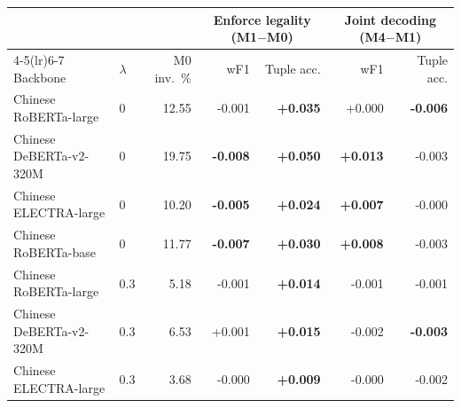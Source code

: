 \begin{tabular}{llrrrrr}
\toprule
 & & & \multicolumn{2}{c}{Enforce legality (M1$-$M0)} & \multicolumn{2}{c}{Joint decoding (M4$-$M1)} \\
\cmidrule(lr){4-5}\cmidrule(lr){6-7}
Backbone & $\lambda$ & M0 inv.\ \% & wF1 & Tuple acc. & wF1 & Tuple acc. \\
\midrule
Chinese RoBERTa-large & 0 & 12.55 & -0.001 & \textbf{+0.035} & +0.000 & \textbf{-0.006} \\
Chinese DeBERTa-v2-320M & 0 & 19.75 & \textbf{-0.008} & \textbf{+0.050} & \textbf{+0.013} & -0.003 \\
Chinese ELECTRA-large & 0 & 10.20 & \textbf{-0.005} & \textbf{+0.024} & \textbf{+0.007} & -0.000 \\
Chinese RoBERTa-base & 0 & 11.77 & \textbf{-0.007} & \textbf{+0.030} & \textbf{+0.008} & -0.003 \\
\midrule
Chinese RoBERTa-large & 0.3 & 5.18 & -0.001 & \textbf{+0.014} & -0.001 & -0.001 \\
Chinese DeBERTa-v2-320M & 0.3 & 6.53 & +0.001 & \textbf{+0.015} & -0.002 & \textbf{-0.003} \\
Chinese ELECTRA-large & 0.3 & 3.68 & -0.000 & \textbf{+0.009} & -0.000 & -0.002 \\
\bottomrule
\end{tabular}

